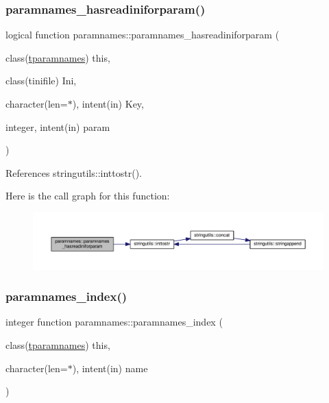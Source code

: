\mbox{\label{namespaceparamnames_aaf4fee3bb682c36fab9b19c05bf98069}} 
\subsubsection{\texorpdfstring{paramnames\+\_\+hasreadiniforparam()}{paramnames\_hasreadiniforparam()}}
{\footnotesize\ttfamily logical function paramnames\+::paramnames\+\_\+hasreadiniforparam (\begin{DoxyParamCaption}\item[{class(\mbox{\hyperlink{structparamnames_1_1tparamnames}{tparamnames}})}]{this,  }\item[{class(tinifile)}]{Ini,  }\item[{character(len=$\ast$), intent(in)}]{Key,  }\item[{integer, intent(in)}]{param }\end{DoxyParamCaption})}



References stringutils\+::inttostr().

Here is the call graph for this function\+:
\nopagebreak
\begin{figure}[H]
\begin{center}
\leavevmode
\includegraphics[width=350pt]{namespaceparamnames_aaf4fee3bb682c36fab9b19c05bf98069_cgraph}
\end{center}
\end{figure}
\mbox{\label{namespaceparamnames_a5c76e741768703cbbdcc06df7508eb55}} 
\subsubsection{\texorpdfstring{paramnames\+\_\+index()}{paramnames\_index()}}
{\footnotesize\ttfamily integer function paramnames\+::paramnames\+\_\+index (\begin{DoxyParamCaption}\item[{class(\mbox{\hyperlink{structparamnames_1_1tparamnames}{tparamnames}})}]{this,  }\item[{character(len=$\ast$), intent(in)}]{name }\end{DoxyParamCaption})\hspace{0.3cm}{\ttfamily [private]}}

